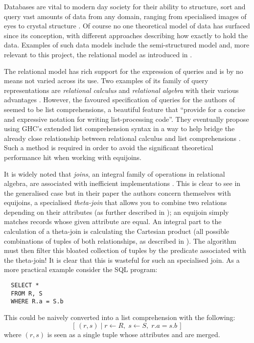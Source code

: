 Databases are vital to modern day society for their ability to structure, sort and query vast amounts of data from any domain, ranging from specialised images of eyes  to crystal structure \cite{CambridgeStructuralDatabase}. Of course no one theoretical model of data has surfaced since its conception, with different approaches describing how exactly to hold the data. Examples of such data models include the semi-structured model \cite{DatabaseSystems} and, more relevant to this project, the relational model \cite{RelationalModel} as introduced in .

The relational model has rich support for the expression of queries and is by no means not varied across its use. Two examples of its family of query representations are \emph{relational calculus} and \emph{relational algebra} with their various advantages \cite{RelationalCalculus,RelationalModel}.  However, the favoured specification of queries for the authors of \cite{RelationalAlgebraByWayOfAdjunctions} seemed to be list comprehensions, a beautiful feature that ``provide for a concise and expressive notation for writing list-processing code''. \cite{MonadComprehensions} They eventually propose using GHC's extended list comprehension syntax in a way to help bridge the already close relationship between relational calculus and list comprehensions \cite{GHCListComprehension,ComprehensiveComprehensions}. Such a method is required in order to avoid the significant theoretical performance hit when working with equijoins.

It is widely noted that \emph{joins}, an integral family of operations in relational algebra, are associated with inefficient implementations \cite{JoinProcessing}. This is clear to see in the generalised case but in their paper \cite{RelationalAlgebraByWayOfAdjunctions} the authors concern themselves with equijoins, a specialised \emph{theta-join} that allows you to combine two relations depending on their attributes (as further described in ); an equijoin simply matches records whose given attribute are equal. An integral part to the calculation of a theta-join is calculating the Cartesian product (all possible combinations of tuples of both relationships, as described in ). The algorithm must then filter this bloated collection of tuples by the predicate associated with the theta-join! It is clear that this is wasteful for such an specialised join. As a more practical example consider the SQL program:
\begin{lstlisting}
  SELECT *
  FROM R, S
  WHERE R.a = S.b
\end{lstlisting}
This could be naively converted into a list comprehension with the following:
\[
  \left[\,(r, s)\;|\;r \leftarrow R,\;s \leftarrow S,\;r.a = s.b\,\right]
\]
where $(r, s)$ is seen as a single tuple whose attributes  and  are merged. 

